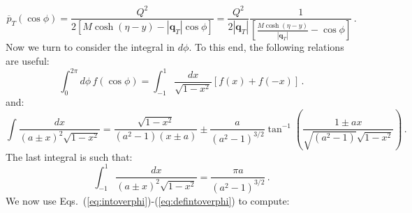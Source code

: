 \documentclass[10pt,a4paper]{article}
\begin{document}
\begin{equation}\label{eq:overpT}
\overline{p}_T(\cos\phi) = \frac{Q^2}{2 \left[M\cosh\left(\eta - y\right)-|\mathbf{q}_T|\cos\phi\right]}=\frac{Q^2}{2 |\mathbf{q}_T|}\frac1{\left[\frac{M\cosh\left(\eta - y\right)}{|\mathbf{q}_T|}-\cos\phi\right]}\,.
\end{equation}
Now we turn to consider the integral in $d\phi$. To this end, the
following relations are useful:
\begin{equation}\label{eq:intoverphi}
\int_0^{2\pi}d\phi\, f(\cos\phi) = \int_{-1}^1\frac{dx}{\sqrt{1-x^2}}\left[f(x)+f(-x)\right]\,.
\end{equation}
and:
\begin{equation}\label{eq:complicatedintegral}
\int \frac{dx}{(a\pm
  x)^2\sqrt{1-x^2}}=\frac{\sqrt{1-x^2}}{(a^2-1)(x\pm
  a)}\pm\frac{a}{(a^2-1)^{3/2}}\tan^{-1}\left(\frac{1\pm ax}{\sqrt{(a^2-1)}\sqrt{1-x^2}}\right)\,.
\end{equation}
The last integral is such that:
\begin{equation}\label{eq:defintoverphi}
\int_{-1}^{1} \frac{dx}{(a\pm x)^2\sqrt{1-x^2}}=\frac{\pi a}{(a^2-1)^{3/2}}\,.
\end{equation}
We now use Eqs.~(\ref{eq:intoverphi})-(\ref{eq:defintoverphi}) to
compute:
\end{document}
